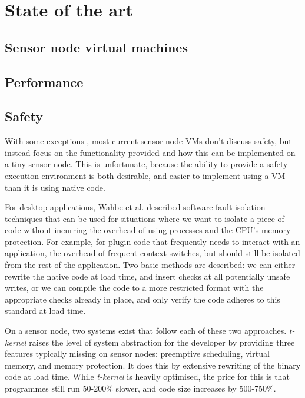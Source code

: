 \chapter{State of the art}

\section{Sensor node virtual machines}

\section{Performance}

\section{Safety}
With some exceptions \cite{Evers:2010ur}, most current sensor node VMs don't discuss safety, but instead focus on the functionality provided and how this can be implemented on a tiny sensor node. This is unfortunate, because the ability to provide a safety execution environment is both desirable, and easier to implement using a VM than it is using native code.

For desktop applications, Wahbe et al. described software fault isolation \cite{Wahbe:1994cj} techniques that can be used for situations where we want to isolate a piece of code without incurring the overhead of using processes and the CPU's memory protection. For example, for plugin code that frequently needs to interact with an application, the overhead of frequent context switches, but should still be isolated from the rest of the application. Two basic methods are described: we can either rewrite the native code at load time, and insert checks at all potentially unsafe writes, or we can compile the code to a more restricted format with the appropriate checks already in place, and only verify the code adheres to this standard at load time.

On a sensor node, two systems exist that follow each of these two approaches. \emph{t-kernel} \cite{Gu:2006ww} raises the level of system abstraction for the developer by providing three features typically missing on sensor nodes: preemptive scheduling, virtual memory, and memory protection. It does this by extensive rewriting of the binary code at load time. While \emph{t-kernel} is heavily optimised, the price for this is that programmes still run 50-200\% slower, and code size increases by 500-750\%.

